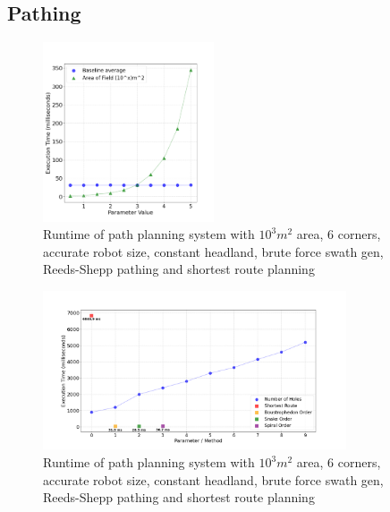 \documentclass[final]{cmpreport_02}
\begin{document}
\clearpage
\subsection{Pathing}

\begin{figure}[h!]
	\centering
	\includegraphics[width=0.45\textwidth]{./images/pathingBaselineAreaRT.png}
	\caption{Runtime of path planning system with $10^3m^2$ area, 6 corners, accurate robot size, constant headland, brute force swath gen, Reeds-Shepp pathing and shortest route planning}
	\label{PE:p:BaselineAreaRT}
\end{figure}

\begin{figure}[h!]
	\centering
	\includegraphics[width=0.8\textwidth]{./images/pathingHolesPathingRT.png}
	\caption{Runtime of path planning system with $10^3m^2$ area, 6 corners, accurate robot size, constant headland, brute force swath gen, Reeds-Shepp pathing and shortest route planning}
	\label{PE:p:HolePathRT}
\end{figure}
\end{document}
